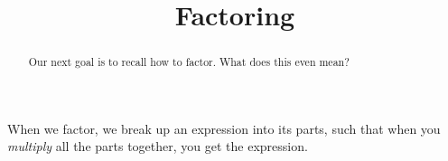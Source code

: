 \documentclass{ximera}
\title{Factoring}
\begin{document}
\begin{abstract}
Our next goal is to recall how to factor.  What does this even mean?
\end{abstract}
\maketitle



When we factor, we break up an expression into its parts, such that when you \emph{multiply} all the parts together, you get the expression.  
%
%
%
%
%
\end{document}
